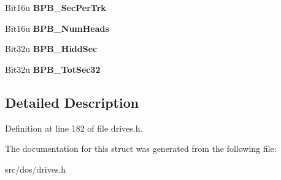 \begin{DoxyCompactItemize}
\item 
\hypertarget{structFAT__BPB__MSDOS331_a47f4b92a84f8ff0bcdb6037abd17700e}{Bit16u {\bfseries B\-P\-B\-\_\-\-Sec\-Per\-Trk}}\label{structFAT__BPB__MSDOS331_a47f4b92a84f8ff0bcdb6037abd17700e}

\item 
\hypertarget{structFAT__BPB__MSDOS331_a10125754a5e94d7c4fe14683b8e8f4f0}{Bit16u {\bfseries B\-P\-B\-\_\-\-Num\-Heads}}\label{structFAT__BPB__MSDOS331_a10125754a5e94d7c4fe14683b8e8f4f0}

\item 
\hypertarget{structFAT__BPB__MSDOS331_a467866206695e095a42ed6a7ef628593}{Bit32u {\bfseries B\-P\-B\-\_\-\-Hidd\-Sec}}\label{structFAT__BPB__MSDOS331_a467866206695e095a42ed6a7ef628593}

\item 
\hypertarget{structFAT__BPB__MSDOS331_a77f88bea23fab71c221bfb72a2865f87}{Bit32u {\bfseries B\-P\-B\-\_\-\-Tot\-Sec32}}\label{structFAT__BPB__MSDOS331_a77f88bea23fab71c221bfb72a2865f87}

\end{DoxyCompactItemize}


\subsection{Detailed Description}


Definition at line 182 of file drives.\-h.



The documentation for this struct was generated from the following file\-:\begin{DoxyCompactItemize}
\item 
src/dos/drives.\-h\end{DoxyCompactItemize}
